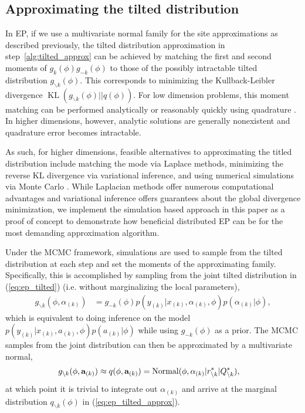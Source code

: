 \subsection{Approximating the tilted distribution}
\label{subsec:ep_alg_approx}

In EP, if we use a multivariate normal family for the site approximations as described previously, the tilted distribution approximation in step~\ref{alg:tilted_approx} can be achieved by matching the first and second moments of $g_k(\phi)g_{-k}(\phi)$ to those of the possibly intractable tilted distribution $g_{\backslash k}(\phi)$. This corresponds to minimizing the Kullback-Leibler divergence $\operatorname{KL}(g_{\backslash k}(\phi) || q(\phi))$. For low dimension problems, this moment matching can be performed analytically \citep[e.g.][]{Opper+Winther:2000,Minka:2001b} or reasonably quickly using quadrature \citep[e.g.][]{Zoeter+Heskes:2005}. In higher dimensions, however, analytic solutions are generally nonexistent and quadrature error becomes intractable.

As such, for higher dimensions, feasible alternatives to approximating the titled distribution include matching the mode via Laplace methods, minimizing the reverse KL divergence via variational inference, and using numerical simulations via Monte Carlo \citep{Gelman+others:2017}. While Laplacian methods offer numerous computational advantages and variational inference offers guarantees about the global divergence minimization, we implement the simulation based approach in this paper as a proof of concept to demonstrate how beneficial distributed EP can be for the most demanding approximation algorithm.

Under the MCMC framework, simulations are used to sample from the tilted distribution at each step and set the moments of the approximating family. Specifically, this is accomplished by sampling from the joint tilted distribution in (\ref{eq:ep_tilted}) (i.e. without marginalizing the local parameters),
\begin{align}
g_{\backslash k} (\phi, \alpha_{(k)}) 
&= g_{-k}(\phi) p(y_{(k)}  | x_{(k)}, \alpha_{(k)}, \phi) p(\alpha_{(k)} | \phi),
\end{align}
which is equivalent to doing inference on the model $p(y_{(k)}  | x_{(k)}, a_{(k)}, \phi) p(a_{(k)} | \phi)$ while using $g_{-k}(\phi)$ as a prior. The MCMC samples from the joint distribution can then be approximated by a multivariate normal,
\begin{align}
g_{\backslash k} (\phi, {\bf a}_{(k)}) 
&\approx q(\phi, {\bf a}_{(k)}) = \text{Normal}(\phi, \alpha_{(k)} | r_{\backslash k}^* | Q_{\backslash k}^*),
\label{eq:ep_joint_tilted_approx}
\end{align}
at which point it is trivial to integrate out $\alpha_{(k)}$ and arrive at the marginal distribution $q_{\backslash k}(\phi)$ in (\ref{eq:ep_tilted_approx}).

